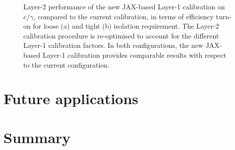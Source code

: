 \begin{figure}
    \centering
    \caption{Layer-2 performance of the new JAX-based Layer-1 calibration on $e/\gamma$, compared to the current calibration, in terms of efficiency turn-on for loose (a) and tight (b) isolation requirement. The Layer-2 calibration procedure is re-optimised to account for the different Layer-1 calibration factors. In both configurations, the new JAX-based Layer-1 calibration provides comparable results with respect to the current configuration.}
    \label{fig:JAX_Layer2_EGs}
\end{figure}

\section{Future applications} %

\section*{Summary} %